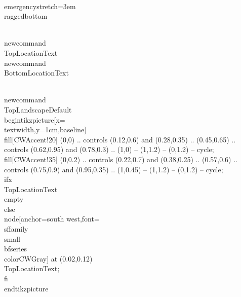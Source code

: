 \\emergencystretch=3em
\\raggedbottom

\\newcommand{\\TopLocationText}{}
\\newcommand{\\BottomLocationText}{}

\\newcommand{\\TopLandscapeDefault}{%
  \\begin{tikzpicture}[x=\\textwidth,y=1cm,baseline]
    \\fill[CWAccent!20] (0,0) .. controls (0.12,0.6) and (0.28,0.35) .. (0.45,0.65) .. controls (0.62,0.95) and (0.78,0.3) .. (1,0) -- (1,1.2) -- (0,1.2) -- cycle;
    \\fill[CWAccent!35] (0,0.2) .. controls (0.22,0.7) and (0.38,0.25) .. (0.57,0.6) .. controls (0.75,0.9) and (0.95,0.35) .. (1,0.45) -- (1,1.2) -- (0,1.2) -- cycle;
    \\ifx\\TopLocationText\\empty\\else
      \\node[anchor=south west,font=\\sffamily\\small\\bfseries\\color{CWGray}] at (0.02,0.12) {\\TopLocationText};
    \\fi
  \\end{tikzpicture}%
}

